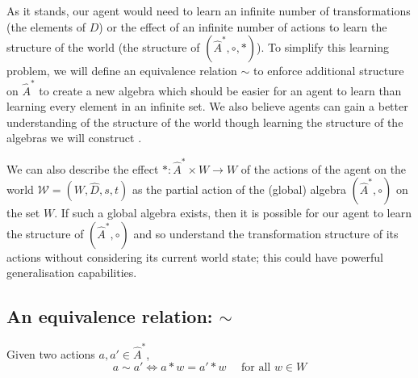 As it stands, our agent would need to learn an infinite number of transformations (the elements of $D$) or the effect of an infinite number of actions to learn the structure of the world (the structure of $(\hat{A}^{\ast}, \circ, \ast)$).
To simplify this learning problem, we will define an equivalence relation $\sim$ to enforce additional structure on $\hat{A}^{\ast}$ to create a new algebra which should be easier for an agent to learn than learning every element in an infinite set.
We also believe agents can gain a better understanding of the structure of the world though learning the structure of the algebras we will construct .

We can also describe the effect $\ast: \hat{A}^{\ast} \times W \to W$ of the actions of the agent on the world $\mathscr{W} = (W, \hat{D}, s, t)$ as the partial action of the (global) algebra $(\hat{A}^{\ast}, \circ)$ on the set $W$.
If such a global algebra exists, then it is possible for our agent to learn the structure of $(\hat{A}^{\ast}, \circ)$ and so understand the transformation structure of its actions without considering its current world state; this could have powerful generalisation capabilities.

\subsection{An equivalence relation: $\sim$}

\begin{definition}
    Given two actions $a, a' \in \hat{A}^{\ast}$,
    \begin{equation}
        a \sim a' \Leftrightarrow a \ast w = a' \ast w \quad \text{ for all $w \in W$}
    \end{equation}
\end{definition}

